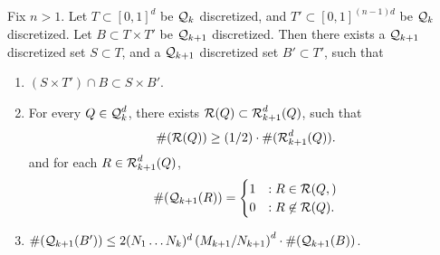 \begin{lemma} \label{Lemma315091513}
    Fix $n > 1$. Let $T \subset [0,1]^d$ be $\operatorname{\mathcal{Q}}_k$ discretized, and $T' \subset [0,1]^{(n-1)d}$ be $\operatorname{\mathcal{Q}}_k$ discretized. Let $B \subset T \times T'$ be $\operatorname{\mathcal{Q}}_{k+1}$ discretized. Then there exists a $\operatorname{\mathcal{Q}}_{k+1}$ discretized set $S \subset T$, and a $\operatorname{\mathcal{Q}}_{k+1}$ discretized set $B' \subset T'$, such that
    \begin{enumerate}
        \item \label{dimensionReductionProperty} $(S \times T') \cap B \subset S \times B'$.

        \item \label{bigProperty} For every $Q \in \operatorname{\mathcal{Q}}_k^d$, there exists $\mathcal{R}(Q) \subset \operatorname{\mathcal{R}}_{k+1}^d(Q)$, such that
        \[ \#(\mathcal{R}(Q)) \geq (1/2) \cdot \#(\operatorname{\mathcal{R}}_{k+1}^d(Q)). \]
        and for each $R \in \operatorname{\mathcal{R}}_{k+1}^d(Q)$,
        \[ \#(\operatorname{\mathcal{Q}}_{k+1}(R)) = \begin{cases} 1 &: R \in \mathcal{R}(Q,) \\ 0 &: R \not \in \mathcal{R}(Q). \end{cases} \]

        \item \label{BBoundProperty} $\#(\operatorname{\mathcal{Q}}_{k+1}(B')) \leq 2 (N_1 \dots N_k)^d \left( M_{k+1}/N_{k+1} \right)^d \cdot \#(\operatorname{\mathcal{Q}}_{k+1}(B))$.
    \end{enumerate}
\end{lemma}
